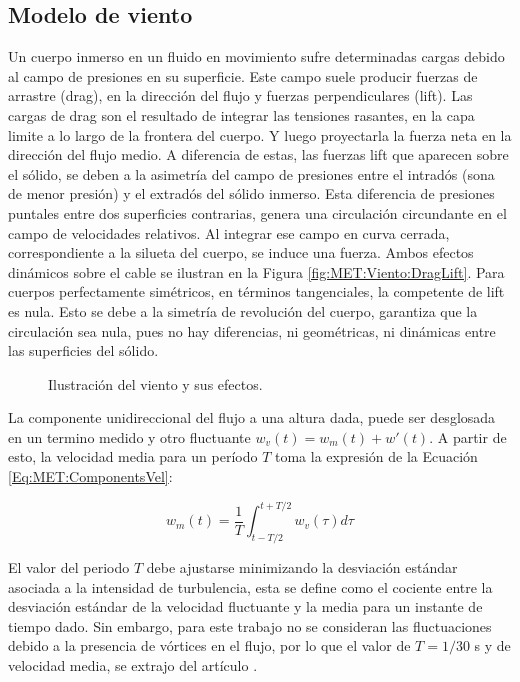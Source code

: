 \subsection{Modelo de viento}\label{Sec:PRE:Modeloviento}
Un cuerpo inmerso en un fluido en movimiento sufre determinadas cargas debido al campo de presiones en su superficie. Este campo suele producir fuerzas de arrastre (drag), en la dirección del flujo y fuerzas perpendiculares (lift). Las cargas de drag son el resultado de integrar las tensiones rasantes, en la capa limite a lo largo de la frontera del cuerpo. Y luego proyectarla la fuerza neta en la dirección del flujo medio. A diferencia de estas, las fuerzas lift que aparecen sobre el sólido, se deben a la asimetría del campo de presiones entre el intradós (sona de menor presión) y el extradós del sólido inmerso. Esta diferencia de presiones puntales entre dos superficies contrarias, genera una circulación circundante en el campo de velocidades relativos. Al integrar ese campo en curva cerrada, correspondiente a la silueta del cuerpo, se induce una fuerza. Ambos efectos dinámicos sobre el cable se ilustran en la Figura \ref{fig:MET:Viento:DragLift}. Para cuerpos perfectamente simétricos, en términos tangenciales, la competente de lift es nula.  Esto se debe a la simetría de revolución del cuerpo, garantiza que la circulación sea nula, pues no hay diferencias, ni geométricas, ni dinámicas entre las superficies del sólido. 


\begingroup
\begin{figure}[htbp]
	\centering
	\caption{Ilustración del viento y sus efectos.} 	\label{fig:Met:Viento:Esquemas}
\end{figure}
\endgroup

La componente unidireccional del flujo a una altura dada, puede ser desglosada en un termino medido y otro fluctuante $w_v(t)=w_m(t)+{w}'(t)$. A partir de esto, la velocidad media para un período $T$ toma la expresión de la Ecuación \eqref{Eq:MET:ComponentsVel}:


\begin{equation}\label{Eq:MET:ComponentsVel}
	w_m(t)=\frac{1}{T}\int_{t-T/2}^{t+T/2}w_v(\tau)d\tau
\end{equation}


El valor del periodo $T$ debe ajustarse minimizando la desviación estándar asociada a la intensidad de turbulencia, esta se define como el cociente entre la desviación estándar de la velocidad fluctuante y la media para un instante de tiempo dado. Sin embargo, para este trabajo no se consideran las fluctuaciones debido a la presencia de vórtices en el flujo, por lo que el valor de $T=1/30$ s y de velocidad media, se extrajo del artículo \citep{stengel2017measurements}.


